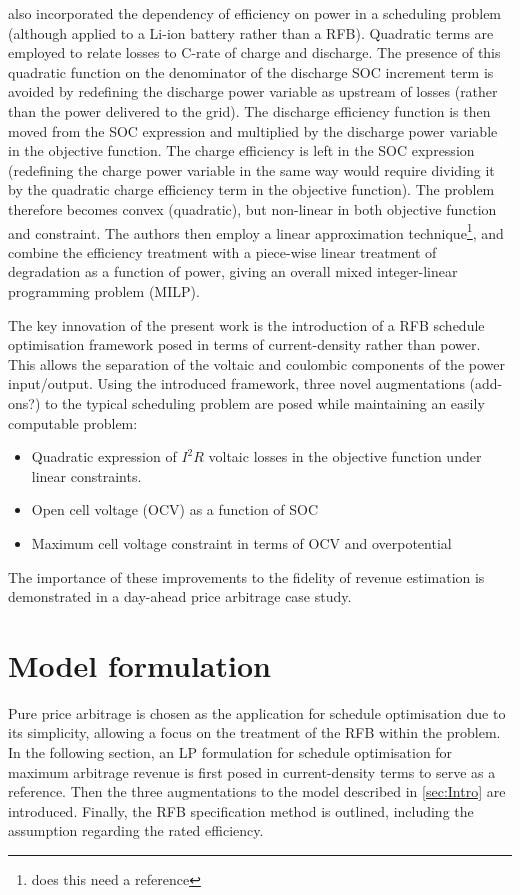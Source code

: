 \documentclass[preprint,3p,review,authoryear,10pt]{elsarticle}
\newcommand{\sol}[1]{\footnote{#1}\marginpar{\fbox{\thefootnote}}}
\begin{document}
\cite{Sarker2017} also incorporated the dependency of efficiency on power in a scheduling problem (although applied to a Li-ion battery rather than a RFB). Quadratic terms are employed to relate losses to C-rate of charge and discharge. The presence of this quadratic function on the denominator of the discharge SOC increment term is avoided by redefining the discharge power variable as upstream of losses (rather than the power delivered to the grid). The discharge efficiency function is then moved from the SOC expression and multiplied by the discharge power variable in the objective function. The charge efficiency is left in the SOC expression (redefining the charge power variable in the same way would require dividing it by the quadratic charge efficiency term in the objective function). The problem therefore becomes convex (quadratic), but non-linear in both objective function and constraint. The authors then employ a linear approximation technique\sol{does this need a reference}, and combine the efficiency treatment with a piece-wise linear treatment of degradation as a function of power, giving an overall mixed integer-linear programming problem (MILP). 

The key innovation of the present work is the introduction of a RFB schedule optimisation framework posed in terms of current-density rather than power. This allows the separation of the voltaic and coulombic components of the power input/output. Using the introduced framework, three novel augmentations (add-ons?) to the typical scheduling problem are posed while maintaining an easily computable problem:

\begin{itemize}
    \item Quadratic expression of $I^2R$ voltaic losses in the objective function under linear constraints.
    \item Open cell voltage (OCV) as a function of SOC
    \item Maximum cell voltage constraint in terms of OCV and overpotential
\end{itemize}

The importance of these improvements to the fidelity of revenue estimation is demonstrated in a day-ahead price arbitrage case study. 


\section{Model formulation}
\label{sec:Model_Formulation}
Pure price arbitrage is chosen as the application for schedule optimisation due to its simplicity, allowing a focus on the treatment of the RFB within the problem. In the following section, an LP formulation for schedule optimisation for maximum arbitrage revenue is first posed in current-density terms to serve as a reference. Then the three augmentations to the model described in \cref{sec:Intro} are introduced. Finally, the RFB specification method is outlined, including the assumption regarding the rated efficiency.
\end{document}
